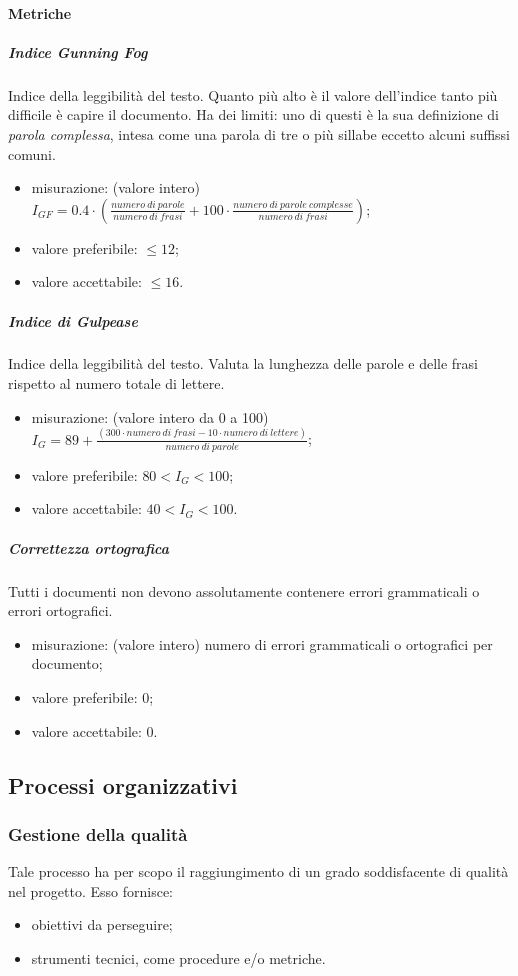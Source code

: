		\paragraph{Metriche}
			\subparagraph{Indice Gunning Fog}
			Indice della leggibilità del testo. Quanto più alto è il valore dell'indice tanto più difficile è capire il documento.					\newline
			Ha dei limiti: uno di questi è la sua definizione di \textit{parola complessa}, intesa come una parola di tre o più sillabe eccetto alcuni suffissi comuni.
			\begin{itemize}
				\item misurazione: (valore intero) $ I_{GF} = 0.4 \cdot
				(
				\frac{numero\ di\ parole}{numero\ di\  frasi}
				+ 100 \cdot
				\frac{numero\ di\ parole\ complesse}{numero\ di\  frasi}
				) $;
				\item valore preferibile: $ \leq 12$;
				\item valore accettabile: $ \leq 16$.
			\end{itemize}
			\subparagraph{Indice di Gulpease}
			Indice della leggibilità del testo. Valuta la lunghezza delle parole e delle frasi rispetto al numero totale di lettere. 
			\begin{itemize}
				\item misurazione: (valore intero da 0 a 100)\newline 	
				$I_G = 89+ \frac{(300 \cdot numero\ di\ frasi - 10 \cdot numero\ di\ lettere)}{numero\ di\ parole}$;	
				\item valore preferibile: $80 < I_G < 100$;
				\item valore accettabile: $40 < I_G < 100$.
			\end{itemize}
			\subparagraph{Correttezza ortografica}
			Tutti i documenti non devono assolutamente contenere errori grammaticali o errori ortografici. 
			\begin{itemize}
				\item misurazione: (valore intero) numero di errori grammaticali o ortografici per documento;
				\item valore preferibile: 0;
				\item valore accettabile: 0.
			\end{itemize}
			
\subsection{Processi organizzativi}
	\subsubsection{Gestione della qualità}
	Tale processo ha per scopo il raggiungimento di un grado soddisfacente di qualità nel progetto. Esso fornisce:
	\begin{itemize}
		\item obiettivi da perseguire;
		\item strumenti tecnici, come procedure e/o metriche.
	\end{itemize}
